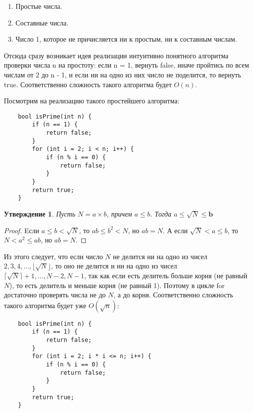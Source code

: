 \documentclass[12pt, a4paper, openany]{book}
\newtheorem*{statement}{Утверждение}
\begin{document}
\begin{enumerate}
    \item Простые числа.
    \item Составные числа.
    \item Число 1, которое не причисляется ни к простым, ни к составным числам.
\end{enumerate}

    Отсюда сразу возникает идея реализации интуитивно понятного алгоритма проверки числа n на простоту: если n = 1, вернуть false, иначе пройтись по всем числам от 2 до n - 1, и если ни на одно из них число не поделится, то вернуть true. Соответственно сложность такого алгоритма будет $O({n})$.

\newpage
\noindent
    Посмотрим на реализацию такого простейшего алгоритма:

\begin{lstlisting}
    bool isPrime(int n) {
        if (n == 1) {
            return false;
        }
        for (int i = 2; i < n; i++) {
            if (n % i == 0) {
                return false;
            }
        }
        return true;
    }
\end{lstlisting}

\begin{statement}
    Пусть $N=a \times b$, причем $a \leq b$. Тогда $a \leq \sqrt{N} \leq \boldsymbol{b}$
\end{statement}

\begin{proof}
    Eсли $a \leq b<\sqrt{N}$, то $a b \leq b^2<N$, но $a b=N$. А если $\sqrt{N}<a \leq b$, то $N<a^2 \leq a b$, но $a b=N$.
\end{proof}

    Из этого следует, что если число $N$ не делится ни на одно из чисел $2,3,4, \ldots,\lfloor\sqrt{N}\rfloor$, то оно не делится и ни на одно из чисел $\lceil\sqrt{N}\rceil+1, \ldots, N-2, N-1$, так как если есть делитель больше корня (не равный $N$), то есть делитель и меньше корня (не равный 1). Поэтому в цикле for достаточно проверять числа не до $N$, а до корня. Соответственно сложность такого алгоритма будет уже $O(\sqrt{n})$:

\begin{lstlisting}
    bool isPrime(int n) {
        if (n == 1) {
            return false;
        }
        for (int i = 2; i * i <= n; i++) {
            if (n % i == 0) {
                return false;
            }
        }
        return true;
    }
\end{lstlisting}
\end{document}
